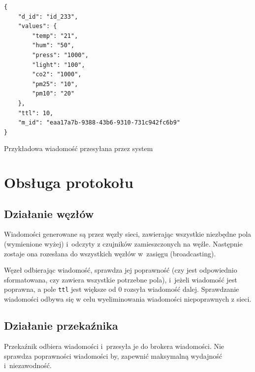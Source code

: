 \begin{lstfloat}[h!]
    \lstset{language=JavaScript}
    \begin{lstlisting}[frame=single]
{
    "d_id": "id_233",
    "values": {
        "temp": "21",
        "hum": "50",
        "press": "1000",
        "light": "100",
        "co2": "1000",
        "pm25": "10",
        "pm10": "20"
    },
    "ttl": 10,
    "m_id": "eaa17a7b-9388-43b6-9310-731c942fc6b9"
}          
\end{lstlisting}
    \caption{Przykładowa wiadomość przesyłana przez system}\label{lst:packet_format}
\end{lstfloat}

\section{Obsługa protokołu}

\subsection{Działanie węzłów}
Wiadomości generowane są przez węzły sieci, zawierając wszystkie niezbędne pola (wymienione wyżej) i~odczyty z czujników zamieszczonych na węźle.
Następnie zostaje ona rozesłana do wszystkich węzłów w~zasięgu (broadcasting).

Węzeł odbierając wiadomość, sprawdza jej poprawność (czy jest odpowiednio sformatowana, czy zawiera wszystkie potrzebne pola), i~jeżeli wiadomość jest poprawna, a pole \texttt{ttl} jest większe od 0 rozsyła wiadomość dalej.
Sprawdzanie wiadomości odbywa się w celu wyeliminowania wiadomości niepoprawnych z sieci.

\subsection{Działanie przekaźnika}
Przekaźnik odbiera wiadomości i~przesyła je do brokera wiadomości.
Nie sprawdza poprawności wiadomości by, zapewnić maksymalną wydajność i~niezawodność.

